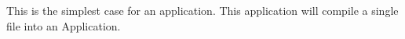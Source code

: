 This is the simplest case for an application. This application will compile a single file into an Application. 